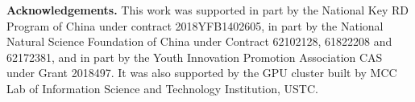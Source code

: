 \documentclass[letterpaper]{article} \usepackage{aaai22}  \usepackage{times}  \usepackage{helvet}  \usepackage{courier}  \usepackage[hyphens]{url}  \usepackage{graphicx} \urlstyle{rm} \def\UrlFont{\rm}  \usepackage{natbib}  \usepackage{caption} \DeclareCaptionStyle{ruled}{labelfont=normalfont,labelsep=colon,strut=off} \frenchspacing  \setlength{\pdfpagewidth}{8.5in}  \setlength{\pdfpageheight}{11in}  \usepackage{algorithm}
\begin{document}
{\flushleft \bf Acknowledgements.} This work was supported in part by the National Key RD Program of China under contract 2018YFB1402605, in part by the National Natural Science Foundation of China under Contract 62102128, 61822208 and 62172381, and in part by the Youth Innovation Promotion Association CAS under Grant 2018497. It was also supported by the GPU cluster built by MCC Lab of Information Science and Technology Institution, USTC.


{
	\small
	
}	
\end{document}
